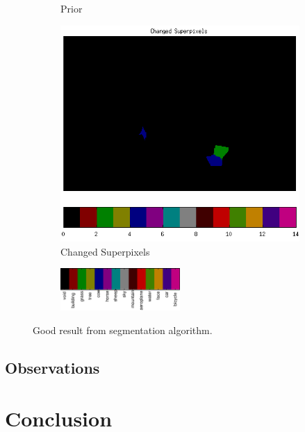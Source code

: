 \documentclass{article} %
\begin{document}
\begin{figure}[htb]
\begin{subfigure}[t]{0.33\textwidth}
		\parbox{0.95\textwidth}{\caption{Prior \label{fig:final_good}}}
	\end{subfigure}
	\begin{subfigure}[t]{0.33\textwidth}
		\centering
		\includegraphics[width = \textwidth]{./img/1_11_s_changed.png}
		\parbox{0.95\textwidth}{\caption{Changed Superpixels \label{fig:changed_good}}}
	\end{subfigure}

	\begin{subfigure}[t]{\textwidth}
		\centering
		\includegraphics[width = 0.5\textwidth]{./img/legend-rot.png}
	\end{subfigure}
	\caption{Good result from segmentation algorithm.}
	\label{fig:result_good}
\end{figure}

\subsection{Observations}

\label{sec:Observations}


\section{Conclusion}
\label{sec:Conclusion}



\end{document}

